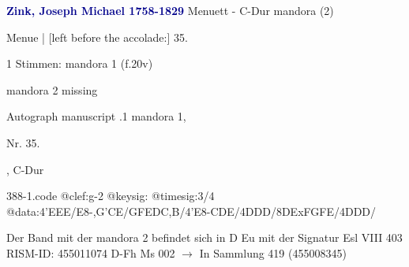 \documentclass[twocolumn]{book}
\begin{document}
\newline \par \vspace{7pt} \textcolor{darkblue}{\textbf{Zink, Joseph Michael  1758-1829}}
\newline Menuett - C-Dur
\newline mandora (2)
\newline \begin{itshape}[f.20v, at left:] Menue | [left before the accolade:] 35.\end{itshape} 
\newline \textcolor{darkblue}{}  1 Stimmen: mandora 1  (f.20v)
\newline \begin{small} mandora 2 missing\end{small} 
\newline Autograph manuscript
.1  mandora 1, \begin{itshape}Nr. 35.\end{itshape}, C-Dur  
\begin{filecontents*}{388-1.code}
@clef:g-2
@keysig:
@timesig:3/4
@data:4'EEE/E8-,G'CE/GFEDC,B/4'E8-CDE/4DDD/8DExFGFE/4DDD/
\end{filecontents*}
\newline
%
\newline Der Band mit der mandora 2 befindet sich in D Eu mit der Signatur Esl VIII 403
\newline RISM-ID: 455011074
\newline D-Fh  Ms 002
\newline $\rightarrow$ In Sammlung 419 (455008345)
      
\end{document}

